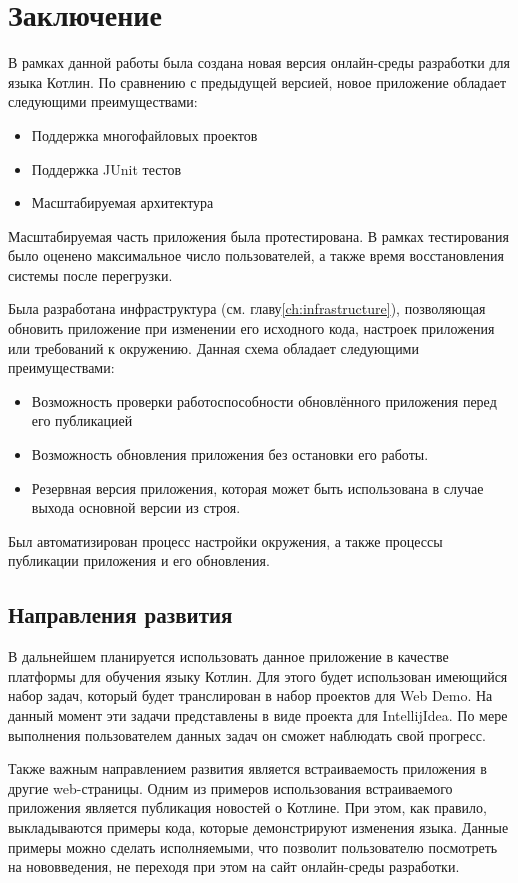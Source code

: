 \chapter*{Заключение}
	В рамках данной работы была создана новая версия онлайн-среды разработки для языка Котлин. По сравнению с предыдущей версией, новое приложение обладает следующими преимуществами:
\begin{itemize}
	\item Поддержка многофайловых проектов
	\item Поддержка JUnit тестов
	\item Масштабируемая архитектура
\end{itemize}
	
	Масштабируемая часть приложения была протестирована. В рамках тестирования было оценено максимальное число пользователей, а также время восстановления системы после перегрузки.
	
	Была разработана инфраструктура (см. главу\ref{ch:infrastructure}), позволяющая обновить приложение при изменении его исходного кода, настроек приложения или требований к окружению. Данная схема обладает следующими преимуществами:
	
\begin{itemize}
	\item Возможность проверки работоспособности обновлённого приложения перед его публикацией
	\item Возможность обновления приложения без остановки его работы.
	\item Резервная версия приложения, которая может быть использована в случае выхода основной версии из строя.
\end{itemize}

	Был автоматизирован процесс настройки окружения, а также процессы публикации приложения и его обновления.
	
\section*{Направления развития}

	В дальнейшем планируется использовать данное приложение в качестве платформы для обучения языку Котлин. Для этого будет использован имеющийся набор задач, который будет транслирован в набор проектов для Web Demo. На данный момент эти задачи представлены в виде проекта для IntellijIdea. По мере выполнения пользователем данных задач он сможет наблюдать свой прогресс.
	
	Также важным направлением развития является встраиваемость приложения в другие web-страницы. Одним из примеров использования встраиваемого приложения является публикация новостей о Котлине. При этом, как правило, выкладываются примеры кода, которые демонстрируют изменения языка. Данные примеры можно сделать исполняемыми, что позволит пользователю посмотреть на нововведения, не переходя при этом на сайт онлайн-среды разработки.